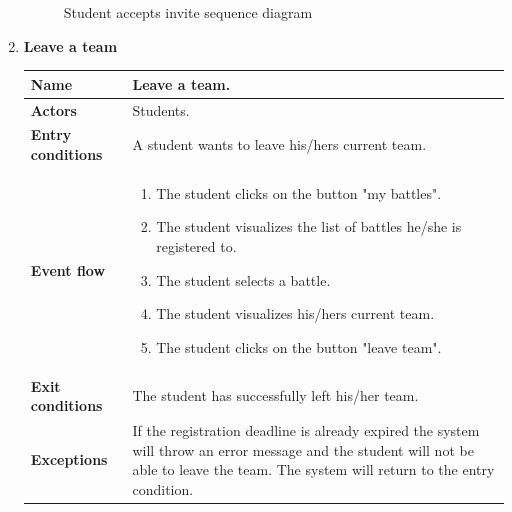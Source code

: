\begin{enumerate}[label=\textbf{UC.\arabic*}]
\begin{figure}[h]
            \caption{Student accepts invite sequence diagram}
            \label{fig:sd-acceptS}
        \end{figure}
        \clearpage
        \item {} \textbf{Leave a team}
        \begin{table}[h]
    	    \centering
                \renewcommand{\arraystretch}{1.5}
                \begin{tabular}{|m{3.2cm}|m{9.8cm}|}
                    \hline
                    \textbf{Name} & Leave a team. \\
                    \hline
                    \textbf{Actors} & Students. \\
                    \hline
                    \textbf{Entry conditions}  & A student wants to leave his/hers current team. \\
                    \hline
                    \textbf{Event flow}  & 
                    \begin{enumerate}[label=\arabic*.]
                        \item The student clicks on the button "my battles".
                        \item The student visualizes the list of battles he/she is registered to.
                        \item The student selects a battle.
                        \item The student visualizes his/hers current team.
                         \item The student clicks on the button "leave team".
                    \end{enumerate}\\ 
                    \hline
                    \textbf{Exit conditions}  & The student has successfully left his/her team. \\
                    \hline
                    \textbf{Exceptions}  & If the registration deadline is already expired the system will throw an error message and the student will not be able to leave the team. The system will return to the entry condition. \\
                    \hline 
                \end{tabular}
        \end{table}
        \begin{figure}[h]
            \centering

\end{figure}
\end{enumerate}
